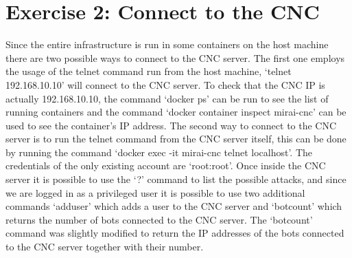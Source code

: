 \section{Exercise 2: Connect to the CNC}
Since the entire infrastructure is run in some containers on the host machine there are two possible ways to connect to the CNC server. The first one employs the usage of the telnet command run from the host machine, `telnet 192.168.10.10' will connect to the CNC server. To check that the CNC IP is actually 192.168.10.10, the command `docker ps' can be run to see the list of running containers and the command `docker container inspect mirai-cnc' can be used to see the container's IP address. The second way to connect to the CNC server is to run the telnet command from the CNC server itself, this can be done by running the command `docker exec -it mirai-cnc telnet localhost'. The credentials of the only existing account are `root:root'. Once inside the CNC server it is possible to use the `?' command to list the possible attacks, and since we are logged in as a privileged user it is possible to use two additional commands `adduser' which adds a user to the CNC server and `botcount' which returns the number of bots connected to the CNC server. The `botcount' command was slightly modified to return the IP addresses of the bots connected to the CNC server together with their number.

